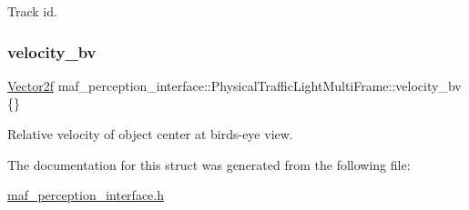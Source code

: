 Track id. 

\mbox{\label{structmaf__perception__interface_1_1PhysicalTrafficLightMultiFrame_a5116dde2c546840a156dad468fd17970}} 
\subsubsection{\texorpdfstring{velocity\+\_\+bv}{velocity\_bv}}
{\footnotesize\ttfamily \hyperlink{structmaf__perception__interface_1_1Vector2f}{Vector2f} maf\+\_\+perception\+\_\+interface\+::\+Physical\+Traffic\+Light\+Multi\+Frame\+::velocity\+\_\+bv \{\}}



Relative velocity of object center at bird\textquotesingle{}s-\/eye view. 



The documentation for this struct was generated from the following file\+:\begin{DoxyCompactItemize}
\item 
\hyperlink{maf__perception__interface_8h}{maf\+\_\+perception\+\_\+interface.\+h}\end{DoxyCompactItemize}
